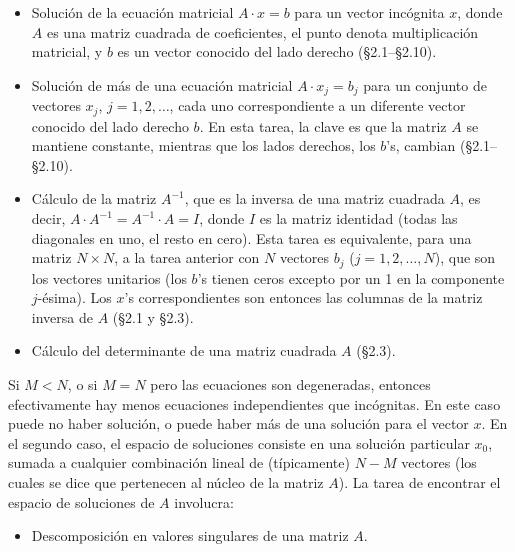 \documentclass[10pt,a4paper]{book}
\begin{document}
\begin{itemize}
  \item Solución de la ecuación matricial \( A \cdot x = b \) para un vector incógnita \( x \), donde \( A \) es una matriz cuadrada de coeficientes, el punto denota multiplicación matricial, y \( b \) es un vector conocido del lado derecho (\S2.1–\S2.10).
  
  \item Solución de más de una ecuación matricial \( A \cdot x_j = b_j \) para un conjunto de vectores \( x_j \), \( j = 1, 2, \dots \), cada uno correspondiente a un diferente vector conocido del lado derecho \( b \). En esta tarea, la clave es que la matriz \( A \) se mantiene constante, mientras que los lados derechos, los \( b \)'s, cambian (\S2.1–\S2.10).
  
  \item Cálculo de la matriz \( A^{-1} \), que es la inversa de una matriz cuadrada \( A \), es decir, \( A \cdot A^{-1} = A^{-1} \cdot A = I \), donde \( I \) es la matriz identidad (todas las diagonales en uno, el resto en cero). Esta tarea es equivalente, para una matriz \( N \times N \), a la tarea anterior con \( N \) vectores \( b_j \) (\( j = 1, 2, \dots, N \)), que son los vectores unitarios (los \( b \)'s tienen ceros excepto por un 1 en la componente \( j \)-ésima). Los \( x \)'s correspondientes son entonces las columnas de la matriz inversa de \( A \) (\S2.1 y \S2.3).
  
  \item Cálculo del determinante de una matriz cuadrada \( A \) (\S2.3).
\end{itemize}

\medskip

Si \( M < N \), o si \( M = N \) pero las ecuaciones son degeneradas, entonces efectivamente hay menos ecuaciones independientes que incógnitas. En este caso puede no haber solución, o puede haber más de una solución para el vector \( x \). En el segundo caso, el espacio de soluciones consiste en una solución particular \( x_0 \), sumada a cualquier combinación lineal de (típicamente) \( N - M \) vectores (los cuales se dice que pertenecen al núcleo de la matriz \( A \)). La tarea de encontrar el espacio de soluciones de \( A \) involucra:

\begin{itemize}
  \item Descomposición en valores singulares de una matriz \( A \).
\end{itemize}
\end{document}
